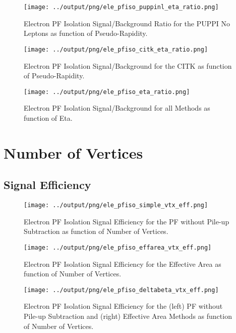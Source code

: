 \documentclass[11pt]{book}
\begin{document}
\begin{figure}[htb]
\centering
\texttt{[image: ../output/png/ele\_pfiso\_puppinl\_eta\_ratio.png]}
\caption{Electron PF Isolation Signal/Background Ratio for the PUPPI No Leptons as function of Pseudo-Rapidity.}
\label{fig:ele_pfiso_eta_ratio_puppinl}
\end{figure}

\begin{figure}[htb]
\centering
\texttt{[image: ../output/png/ele\_pfiso\_citk\_eta\_ratio.png]}
\caption{Electron PF Isolation Signal/Background for the CITK as function of Pseudo-Rapidity.}
\label{fig:ele_pfiso_eta_ratio_citk}
\end{figure}

\begin{figure}[htb]
\centering
\texttt{[image: ../output/png/ele\_pfiso\_eta\_ratio.png]}
\caption{Electron PF Isolation Signal/Background for all Methods as function of Eta.}
\label{fig:ele_pfiso_eta_ratio}
\end{figure}
\clearpage

\section{Number of Vertices}
\subsection{Signal Efficiency}
\begin{figure}[htb]
\centering
\texttt{[image: ../output/png/ele\_pfiso\_simple\_vtx\_eff.png]}
\caption{Electron PF Isolation Signal Efficiency for the PF without Pile-up Subtraction as function of Number of Vertices.}
\label{fig:ele_pfiso_vtx_eff_simple}
\end{figure}

\begin{figure}[htb]
\centering
\texttt{[image: ../output/png/ele\_pfiso\_effarea\_vtx\_eff.png]}
\caption{Electron PF Isolation Signal Efficiency for the Effective Area as function of Number of Vertices.}
\label{fig:ele_pfiso_vtx_eff_effarea}
\end{figure}

\begin{figure}[htb]
\centering
\texttt{[image: ../output/png/ele\_pfiso\_deltabeta\_vtx\_eff.png]}
\caption{Electron PF Isolation Signal Efficiency for the (left) PF without Pile-up Subtraction and (right) Effective Area Methods as function of Number of Vertices.}
\label{fig:ele_pfiso_vtx_eff_deltabeta}
\end{figure}
\end{document}
